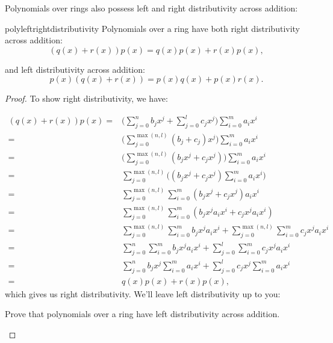 Polynomials over rings also possess  left and right distributivity across addition:

\begin{prop}{polyleftrightdistributivity} Polynomials over a ring have both right distributivity across addition:
\[(q(x)+r(x)) p(x) = q(x)p(x)+r(x)p(x),\]

and left distributivity across addition:
\[p(x)(q(x)+r(x)) = p(x)q(x)+p(x)r(x).\]

\end{prop}

\begin{proof}{}
To show right distributivity, we have:

\begin{align*}
(q(x)+r(x)) p(x)=&\bigg(\sum^{n}_{j=0} b_j x^j +  \sum^{l}_{j=0} c_jx^j\bigg)\sum^{m}_{i=0} a_i x^i\\
=&\bigg(\sum_{j=0}^{\max(n,l)} (b_j + c_j) x^j\bigg)\sum^{m}_{i=0} a_i x^i\\
=&\bigg(\sum_{j=0}^{\max(n,l)} (b_j x^j+ c_j x^j)\bigg)\sum^{m}_{i=0}a_ix^i\\
=&\sum_{j=0}^{\max(n,l)}\bigg((b_j x^j+ c_j x^j)\sum^{m}_{i=0}a_ix^i\bigg)\\
=&\sum_{j=0}^{\max(n,l)}\sum^{m}_{i=0} (b_j x^j+ c_j x^j)a_ix^i\\
=&\sum_{j=0}^{\max(n,l)}\sum^{m}_{i=0} (b_j x^ja_ix^i+ c_j x^ja_ix^i)\\
=&\sum_{j=0}^{\max(n,l)}\sum^{m}_{i=0} b_j x^ja_ix^i+ \sum_{j=0}^{\max(n,l)}\sum^{m}_{i=0}c_j x^ja_ix^i\\
=&\sum_{j=0}^{n}\sum^{m}_{i=0} b_j x^ja_ix^i+ \sum_{j=0}^{l}\sum^{m}_{i=0}c_j x^ja_ix^i\\
=&\sum^{n}_{j=0} b_j x^j\sum^{m}_{i=0} a_i x^i+ \sum^{l}_{j=0} c_jx^j \sum^{m}_{i=0} a_i x^i\\
=&q(x)p(x)+r(x)p(x),
\end{align*}
which gives us right distributivity. We'll leave left distributivity up to you:

\begin{exercise}{}
Prove that polynomials over a ring have left distributivity across addition.
\end{exercise}
\end{proof}
%
